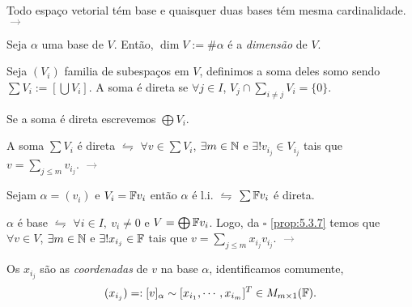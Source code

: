 \begin{theorem}
    Todo espaço vetorial tém base e quaisquer duas bases tém mesma cardinalidade. \textcolor{gray}{\(\rightarrow \) \cite[Pág. 185]{MA719}}%
\end{theorem}

\begin{definition}
    Seja \(\alpha\) uma base de \(V\). Então, \(\dim V := \# \alpha\) é a \emph{dimensão} de \(V\).  
\end{definition}

\begin{definition}
    Seja \((V_i)\) familia de subespaços em \(V\), definimos a soma deles somo sendo \(\sum V_i := \left[\bigcup V_i\right]\). A soma é direta se \(\forall j\in I\), \(V_j \cap \sum_{i\neq j} V_i =\{0\}\). 
\end{definition}

\begin{note}
    Se a soma é direta escrevemos \(\bigoplus V_i\). 
\end{note}

\begin{proposition}
    \label{prop:5.3.7}
    A soma \(\sum V_i\) é direta \(\leftrightharpoons\) \(\forall v\in \sum V_i\), \(\exists m\in \mathbb{N} \) e \(\exists! v_{i_j} \in V_{i_j}\) tais que \(v = \sum_{j\leq m} v_{i_j}\). \textcolor{gray}{\(\rightarrow\)  \cite[Pág. 174]{MA719}} 
\end{proposition}

\begin{proposition}
    \label{prop:5.4.6}
    Sejam \(\alpha = (v_i)\) e \(V_i = \mathbb{F} v_i\) então \(\alpha\) é l.i. \(\leftrightharpoons\) \(\sum \mathbb{F} v_i\) é direta. 
\end{proposition}

\newcommand{\comentario}[1]{\textcolor{gray}{\(\rightarrow\) #1}}

\begin{corollary}
    \(\alpha\) é base \(\leftrightharpoons\) \(\forall i\in I,\ v_i \neq 0\) e \(V = \bigoplus \mathbb{F} v_i\). Logo, da \(\square \) \ref{prop:5.3.7} temos que \(\forall v\in V\), \(\exists m \in \mathbb{N}\) e \(\exists !x_{i_j} \in \mathbb{F}\) tais que \(v = \sum_{j\leq m } x_{i_j}v_{i_j}\). \comentario{\cite[Pág. 178]{MA719}}
\end{corollary}

\begin{note}
Os \(x_{i_j}\) são as \emph{coordenadas} de \(v\) na base \(\alpha\), identificamos comumente,  
\[(x_{i_j}) =: [v]_\alpha \sim  [ x_{i_1}, \cdots,  x_{i_m}]^T \in M_{m\times 1}(\mathbb{F}).\]
\end{note}
\- \vspace{-1.4cm}
\propositionnum{ \hspace{-0.3cm}}



